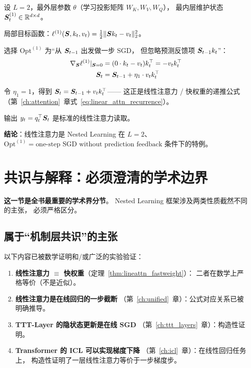 \begin{example}
设 $L=2$，最外层参数 $\theta$（学习投影矩阵 $W_K, W_V, W_Q$），
最内层维护状态 $\boldsymbol{S}_t^{(1)} \in \mathbb{R}^{d \times d}$。

局部目标函数：$\ell^{(1)}(\boldsymbol{S}, k_t, v_t) = \frac{1}{2}\|\boldsymbol{S} k_t - v_t\|_2^2$。

选择 $\mathrm{Opt}^{(1)}$ 为``从 $\boldsymbol{S}_{t-1}$ 出发做一步 SGD，
但忽略预测反馈项 $\boldsymbol{S}_{t-1} k_t$''：
\begin{align}
  \nabla_{\boldsymbol{S}} \ell^{(1)}|_{\boldsymbol{S} = 0} &= (0 \cdot k_t - v_t) k_t^\top = -v_t k_t^\top \\
  \boldsymbol{S}_t &= \boldsymbol{S}_{t-1} + \eta_1 \cdot v_t k_t^\top
\end{align}

令 $\eta_1 = 1$，得到 $\boldsymbol{S}_t = \boldsymbol{S}_{t-1} + v_t k_t^\top$——
这正是线性注意力 / 快权重的递推公式
（第~\ref{ch:attention}~章式~\eqref{eq:linear_attn_recurrence}）。

输出 $y_t = q_t^\top \boldsymbol{S}_t$ 是标准的线性注意力读取。

\textbf{结论}：线性注意力是 Nested Learning 在
$L=2$、$\mathrm{Opt}^{(1)} = \text{one-step SGD without prediction feedback}$
条件下的特例。
\end{example}

\section{共识与解释：必须澄清的学术边界}
\label{sec:nested_boundary}

\textbf{这一节是全书最重要的学术界分节}。
Nested Learning 框架涉及两类性质截然不同的主张，
必须严格区分。

\subsection*{属于``机制层共识''的主张}

以下内容已被数学证明和/或广泛的实验验证：
\begin{enumerate}
  \item \textbf{线性注意力 $\equiv$ 快权重}（定理~\ref{thm:lineattn_fastweight}）：
        二者在数学上严格等价（不是近似）。
  \item \textbf{线性注意力是在线回归的一步截断}
       （第~\ref{ch:unified}~章）：公式对应关系已被明确推导。
  \item \textbf{TTT-Layer 的隐状态更新是在线 SGD}
       （第~\ref{ch:ttt_layers}~章）：构造性证明。
  \item \textbf{Transformer 的 ICL 可以实现梯度下降}
       （第~\ref{ch:icl}~章）：在线性回归任务上，
        构造性证明了一层线性注意力等价于一步梯度步。
\end{enumerate}

